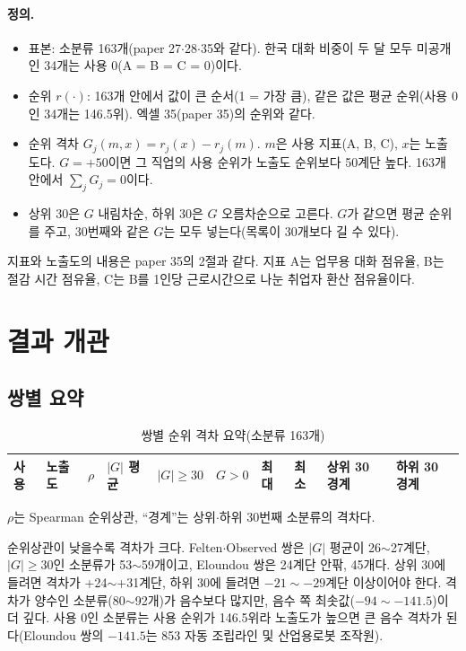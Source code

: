 \documentclass[11pt]{article}
\begin{document}
\paragraph{정의.}
\begin{itemize}[leftmargin=*]
  \item 표본: 소분류 163개(paper 27$\cdot$28$\cdot$35와 같다). 한국 대화 비중이 두 달 모두 미공개인 34개는 사용 0(A = B = C = 0)이다.
  \item 순위 $r(\cdot)$: 163개 안에서 값이 큰 순서(1 = 가장 큼), 같은 값은 평균 순위(사용 0인 34개는 146.5위). 엑셀 35(paper 35)의 순위와 같다.
  \item 순위 격차 $G_{j}(m, x) = r_j(x) - r_j(m)$. $m$은 사용 지표(A, B, C), $x$는 노출도다. $G = +50$이면 그 직업의 사용 순위가 노출도 순위보다 50계단 높다. 163개 안에서 $\sum_j G_j = 0$이다.
  \item 상위 30은 $G$ 내림차순, 하위 30은 $G$ 오름차순으로 고른다. $G$가 같으면 평균 순위를 주고, 30번째와 같은 $G$는 모두 넣는다(목록이 30개보다 길 수 있다).
\end{itemize}
지표와 노출도의 내용은 paper 35의 2절과 같다. 지표 A는 업무용 대화 점유율, B는 절감 시간 점유율, C는 B를 1인당 근로시간으로 나눈 취업자 환산 점유율이다.

\section{결과 개관}

\subsection{쌍별 요약}

\begin{small}
\begin{longtable}{L{1.3cm}L{2.6cm}R{1.0cm}R{1.3cm}R{1.4cm}R{1.4cm}R{1.2cm}R{1.2cm}R{1.5cm}R{1.5cm}}
\caption{쌍별 순위 격차 요약(소분류 163개)}\label{tab:summary}\\
\toprule
사용 & 노출도 & $\rho$ & $|G|$ 평균 & $|G| \ge 30$ & $G > 0$ & 최대 & 최소 & 상위 30 경계 & 하위 30 경계 \\
\midrule
\endfirsthead

\bottomrule
\end{longtable}
\end{small}
\noindent $\rho$는 Spearman 순위상관, ``경계''는 상위$\cdot$하위 30번째 소분류의 격차다.

순위상관이 낮을수록 격차가 크다. Felten$\cdot$Observed 쌍은 $|G|$ 평균이 26$\sim$27계단, $|G| \ge 30$인 소분류가 53$\sim$59개이고, Eloundou 쌍은 24계단 안팎, 45개다. 상위 30에 들려면 격차가 +24$\sim$+31계단, 하위 30에 들려면 $-21\sim-29$계단 이상이어야 한다. 격차가 양수인 소분류(80$\sim$92개)가 음수보다 많지만, 음수 쪽 최솟값($-94\sim-141.5$)이 더 깊다. 사용 0인 소분류는 사용 순위가 146.5위라 노출도가 높으면 큰 음수 격차가 된다(Eloundou 쌍의 $-141.5$는 853 자동 조립라인 및 산업용로봇 조작원).
\end{document}
